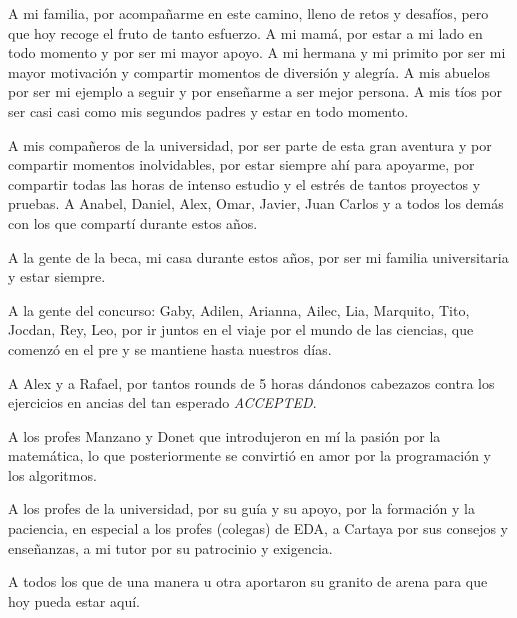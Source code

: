 \begin{acknowledgements}
    A mi familia, por acompañarme en este camino, lleno de retos y desafíos, pero que hoy recoge el fruto de tanto esfuerzo.
    A mi mamá, por estar a mi lado en todo momento y por ser mi mayor apoyo. A mi hermana y mi primito por ser mi mayor motivación y compartir
    momentos de diversión y alegría. A mis abuelos por ser mi ejemplo a seguir y por enseñarme a ser mejor persona.
    A mis tíos por ser casi casi como mis segundos padres y estar en todo momento.
    
    A mis compañeros de la universidad, por ser parte de esta gran aventura y por compartir momentos inolvidables, por 
    estar siempre ahí para apoyarme, por compartir todas las horas de intenso estudio y el estrés de tantos proyectos y pruebas.
    A Anabel, Daniel, Alex, Omar, Javier, Juan Carlos y a todos los demás con los que compartí durante estos años.
    
    A la gente de la beca, mi casa durante estos años, por ser mi familia universitaria y estar siempre.
    
    A la gente del concurso: Gaby, Adilen, Arianna, Ailec, Lia, Marquito, Tito, Jocdan, Rey, Leo,  por ir juntos en el viaje por el mundo de las ciencias, que comenzó en el pre y 
    se mantiene hasta nuestros días. 
    
    A Alex y a Rafael, por tantos rounds de 5 horas dándonos cabezazos contra los ejercicios en ancias del tan esperado 
    \textit{ACCEPTED}.
    
    A los profes Manzano y Donet que introdujeron en mí la pasión por la matemática, lo que posteriormente se convirtió
    en amor por la programación y los algoritmos.
    
    A los profes de la universidad, por su guía y su apoyo, por la formación y la paciencia, en especial a los profes (colegas) de EDA,
    a Cartaya por sus consejos y enseñanzas, a mi tutor por su patrocinio y exigencia.
    
    A todos los que de una manera u otra aportaron su granito de arena para que hoy pueda estar aquí.
\end{acknowledgements}